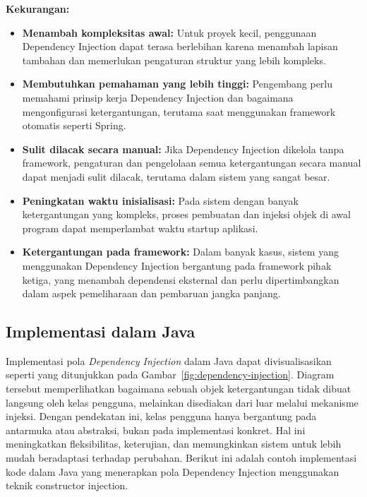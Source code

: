 \textbf{Kekurangan:}
\begin{itemize}
\item \textbf{Menambah kompleksitas awal:} Untuk proyek kecil, penggunaan Dependency Injection dapat terasa berlebihan karena menambah lapisan tambahan dan memerlukan pengaturan struktur yang lebih kompleks.

\item \textbf{Membutuhkan pemahaman yang lebih tinggi:} Pengembang perlu memahami prinsip kerja Dependency Injection dan bagaimana mengonfigurasi ketergantungan, terutama saat menggunakan framework otomatis seperti Spring.

\item \textbf{Sulit dilacak secara manual:} Jika Dependency Injection dikelola tanpa framework, pengaturan dan pengelolaan semua ketergantungan secara manual dapat menjadi sulit dilacak, terutama dalam sistem yang sangat besar.

\item \textbf{Peningkatan waktu inisialisasi:} Pada sistem dengan banyak ketergantungan yang kompleks, proses pembuatan dan injeksi objek di awal program dapat memperlambat waktu startup aplikasi.

\item \textbf{Ketergantungan pada framework:} Dalam banyak kasus, sistem yang menggunakan Dependency Injection bergantung pada framework pihak ketiga, yang menambah dependensi eksternal dan perlu dipertimbangkan dalam aspek pemeliharaan dan pembaruan jangka panjang.
\end{itemize}


\subsection{Implementasi dalam Java}

Implementasi pola \textit{Dependency Injection} dalam Java dapat divisualisasikan seperti yang ditunjukkan pada Gambar~\ref{fig:dependency-injection}. Diagram tersebut memperlihatkan bagaimana sebuah objek ketergantungan tidak dibuat langsung oleh kelas pengguna, melainkan disediakan dari luar melalui mekanisme injeksi. Dengan pendekatan ini, kelas pengguna hanya bergantung pada antarmuka atau abstraksi, bukan pada implementasi konkret. Hal ini meningkatkan fleksibilitas, keterujian, dan memungkinkan sistem untuk lebih mudah beradaptasi terhadap perubahan. Berikut ini adalah contoh implementasi kode dalam Java yang menerapkan pola Dependency Injection menggunakan teknik constructor injection.

